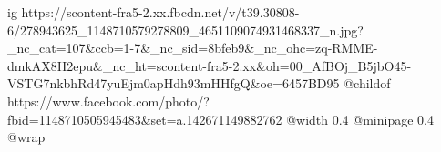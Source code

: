  
 
 
 
 

\ifcmt
  ig https://scontent-fra5-2.xx.fbcdn.net/v/t39.30808-6/278943625_1148710579278809_4651109074931468337_n.jpg?_nc_cat=107&ccb=1-7&_nc_sid=8bfeb9&_nc_ohc=zq-RMME-dmkAX8H2epu&_nc_ht=scontent-fra5-2.xx&oh=00_AfBOj_B5jbO45-VSTG7nkbhRd47yuEjm0apHdh93mHHfgQ&oe=6457BD95
  @childof https://www.facebook.com/photo/?fbid=1148710505945483&set=a.142671149882762
  @width 0.4
  @minipage 0.4
  @wrap \parpic[r]
\fi
